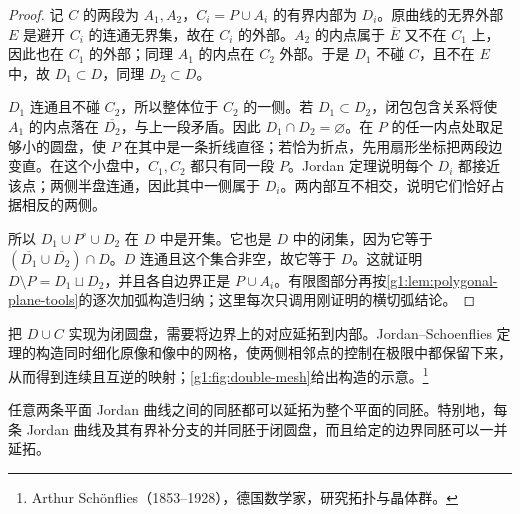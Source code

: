 \begin{proof}
	记 \(C\) 的两段为 \(A_1,A_2\)，\(C_i=P\cup A_i\) 的有界内部为 \(D_i\)。原曲线的无界外部 \(E\) 是避开 \(C_i\) 的连通无界集，故在 \(C_i\) 的外部。\(A_2\) 的内点属于 \(\overline E\) 又不在 \(C_1\) 上，因此也在 \(C_1\) 的外部；同理 \(A_1\) 的内点在 \(C_2\) 外部。于是 \(D_1\) 不碰 \(C\)，且不在 \(E\) 中，故 \(D_1\subset D\)，同理 \(D_2\subset D\)。

	\(D_1\) 连通且不碰 \(C_2\)，所以整体位于 \(C_2\) 的一侧。若 \(D_1\subset D_2\)，闭包包含关系将使 \(A_1\) 的内点落在 \(\overline{D_2}\)，与上一段矛盾。因此 \(D_1\cap D_2=\varnothing\)。在 \(P\) 的任一内点处取足够小的圆盘，使 \(P\) 在其中是一条折线直径；若恰为折点，先用扇形坐标把两段边变直。在这个小盘中，\(C_1,C_2\) 都只有同一段 \(P\)。Jordan 定理说明每个 \(D_i\) 都接近该点；两侧半盘连通，因此其中一侧属于 \(D_i\)。两内部互不相交，说明它们恰好占据相反的两侧。

	所以 \(D_1\cup P^\circ\cup D_2\) 在 \(D\) 中是开集。它也是 \(D\) 中的闭集，因为它等于 \((\overline{D_1}\cup\overline{D_2})\cap D\)。\(D\) 连通且这个集合非空，故它等于 \(D\)。这就证明 \(D\setminus P=D_1\sqcup D_2\)，并且各自边界正是 \(P\cup A_i\)。有限图部分再按\cref{g1:lem:polygonal-plane-tools}的逐次加弧构造归纳；这里每次只调用刚证明的横切弧结论。
\end{proof}

把 \(D\cup C\) 实现为闭圆盘，需要将边界上的对应延拓到内部。Jordan--Schoenflies 定理的构造同时细化原像和像中的网格，使两侧相邻点的控制在极限中都保留下来，从而得到连续且互逆的映射；\cref{g1:fig:double-mesh}给出构造的示意。\footnote{Arthur Sch\"onflies（1853--1928），德国数学家，研究拓扑与晶体群。}



\begin{theorem}\label{g1:thm:jordan-schoenflies}
	任意两条平面 Jordan 曲线之间的同胚都可以延拓为整个平面的同胚。特别地，每条 Jordan 曲线及其有界补分支的并同胚于闭圆盘，而且给定的边界同胚可以一并延拓。
\end{theorem}

